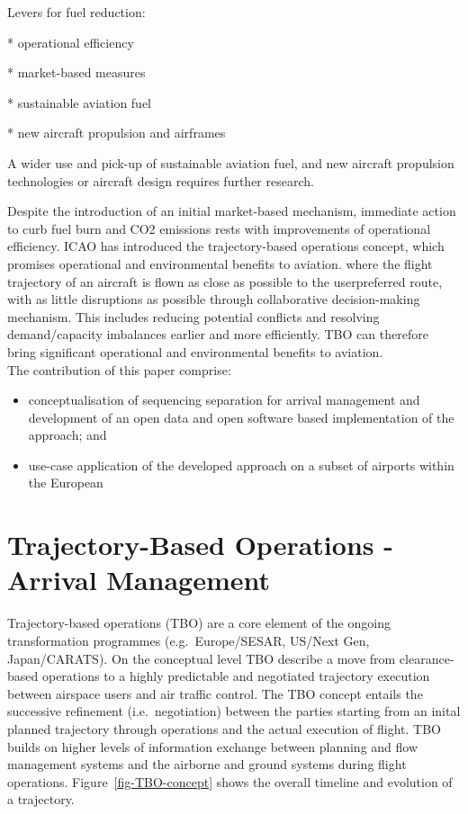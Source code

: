 \documentclass[letterpaper, 10 pt, journal, twoside]{IEEEtran}
\begin{document}
Levers for fuel reduction:

* operational efficiency

* market-based measures

* sustainable aviation fuel

* new aircraft propulsion and airframes

A wider use and pick-up of sustainable aviation fuel, and new aircraft
propulsion technologies or aircraft design requires further research.

Despite the introduction of an initial market-based mechanism, immediate
action to curb fuel burn and CO2 emissions rests with improvements of
operational efficiency. ICAO has introduced the trajectory-based
operations concept, which promises operational and environmental
benefits to aviation. where the flight trajectory of an aircraft is
flown as close as possible to the userpreferred route, with as little
disruptions as possible through collaborative decision-making mechanism.
This includes reducing potential conflicts and resolving demand/capacity
imbalances earlier and more efficiently. TBO can therefore bring
significant operational and environmental benefits to aviation.\\

The contribution of this paper comprise:

\begin{itemize}
\item
  conceptualisation of sequencing separation for arrival management and
  development of an open data and open software based implementation of
  the approach; and
\item
  use-case application of the developed approach on a subset of airports
  within the European
\end{itemize}

\hypertarget{trajectory-based-operations---arrival-management}{%
\section{Trajectory-Based Operations - Arrival
Management}\label{trajectory-based-operations---arrival-management}}

Trajectory-based operations (TBO) are a core element of the ongoing
transformation programmes (e.g.~Europe/SESAR, US/Next Gen,
Japan/CARATS). On the conceptual level TBO describe a move from
clearance-based operations to a highly predictable and negotiated
trajectory execution between airspace users and air traffic control. The
TBO concept entails the successive refinement (i.e.~negotiation) between
the parties starting from an inital planned trajectory through
operations and the actual execution of flight. TBO builds on higher
levels of information exchange between planning and flow management
systems and the airborne and ground systems during flight operations.
Figure~\ref{fig-TBO-concept} shows the overall timeline and evolution of
a trajectory.
\end{document}
